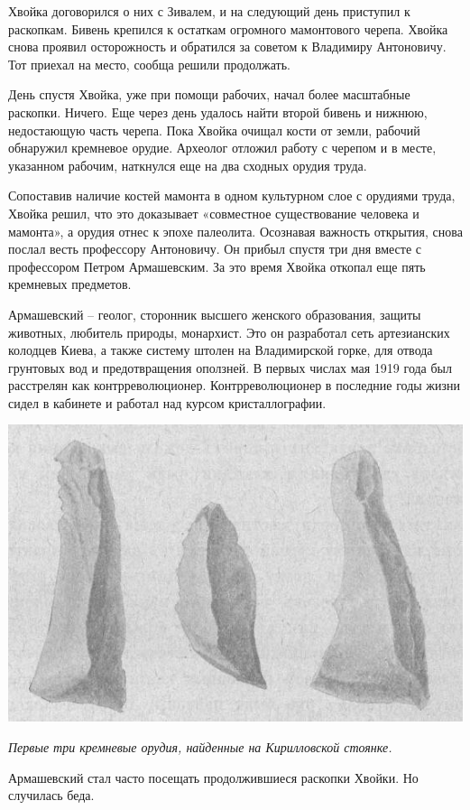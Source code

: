 Хвойка договорился о них с Зивалем, и на следующий день приступил к раскопкам. Бивень крепился к остаткам огромного мамонтового черепа. Хвойка снова проявил осторожность и обратился за советом к Владимиру Антоновичу. Тот приехал на место, сообща решили продолжать. 

День спустя Хвойка, уже при помощи рабочих, начал более масштабные раскопки. Ничего. Еще через день удалось найти второй бивень и нижнюю, недостающую часть черепа. Пока Хвойка очищал кости от земли, рабочий обнаружил кремневое орудие. Археолог отложил работу с черепом и в месте, указанном рабочим, наткнулся еще на два сходных орудия труда.

Сопоставив наличие костей мамонта в одном культурном слое с орудиями труда, Хвойка решил, что это доказывает «совместное существование человека и мамонта», а орудия отнес к эпохе палеолита. Осознавая важность открытия, снова послал весть профессору Антоновичу. Он прибыл спустя три дня вместе с профессором Петром Армашевским. За это время Хвойка откопал еще пять кремневых предметов.

Армашевский – геолог, сторонник высшего женского образования, защиты животных, любитель природы, монархист. Это он разработал сеть артезианских колодцев Киева, а также систему штолен на Владимирской горке, для отвода грунтовых вод и предотвращения оползней. В первых числах мая 1919 года был расстрелян как контрреволюционер. Контрреволюционер в последние годы жизни сидел в кабинете и работал над курсом кристаллографии.

\begin{center}
\includegraphics[width=0.70\linewidth]{chast-kirvys/kirstoy/1893-hvoyka-kremen-01.jpg}

\textit{Первые три кремневые орудия, найденные на Кирилловской стоянке.}
\end{center}

Армашевский стал часто посещать продолжившиеся раскопки Хвойки. Но случилась беда. 

